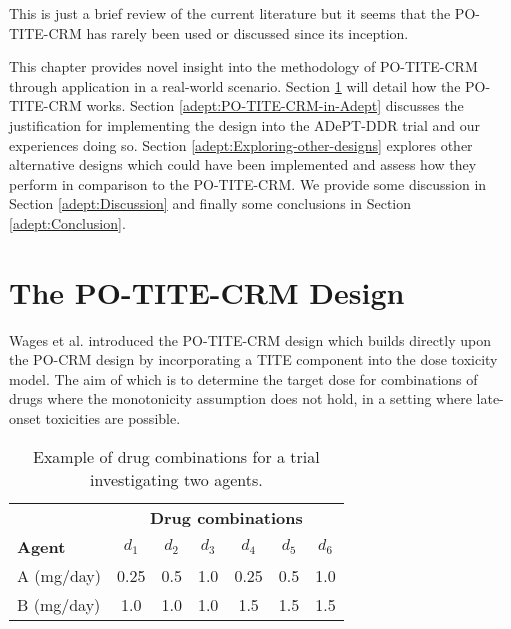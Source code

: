 This is just a brief review of the current literature but it seems that the PO-TITE-CRM has rarely been used or discussed since its inception. 

This chapter provides novel insight into the methodology of PO-TITE-CRM through application in a real-world scenario. Section \ref{adept:PO-TITE-CRM-Design} will detail how the PO-TITE-CRM works. Section \ref{adept:PO-TITE-CRM-in-Adept} discusses the justification for implementing the design into the ADePT-DDR trial and our experiences doing so. Section \ref{adept:Exploring-other-designs} explores other alternative designs which could have been implemented and assess how they perform in comparison to the PO-TITE-CRM. We provide some discussion in Section \ref{adept:Discussion} and finally some conclusions in Section \ref{adept:Conclusion}.

\section{The PO-TITE-CRM Design}
\label{adept:PO-TITE-CRM-Design} 

Wages et al. \cite{wagesUsingTimetoeventContinual2013} introduced the PO-TITE-CRM design which builds directly upon the PO-CRM design by incorporating a TITE component into the dose toxicity model. The aim of which is to determine the target dose for combinations of drugs where the monotonicity assumption does not hold, in a setting where late-onset toxicities are possible.

\begin{table}[h!]
	\centering
	\caption[Example drug combinations with two agents.]{Example of drug combinations for a trial investigating two agents.}
	\label{tab_adept:ex_drug_combo}
	\begin{tabular}{lcccccc}
		\hline  & \multicolumn{6}{c}{\textbf{Drug combinations}}  \\
		\textbf{Agent} & $d_{1}$ & $d_{2}$ & $d_{3}$ & $d_{4}$ & $d_{5}$ & $d_{6}$ \\ \hline
		A (mg/day) & 0.25 & 0.5 & 1.0 & 0.25 & 0.5 & 1.0         \\
		B (mg/day) & 1.0  & 1.0 & 1.0 & 1.5  & 1.5 & 1.5         \\ \hline
	\end{tabular}
\end{table}

